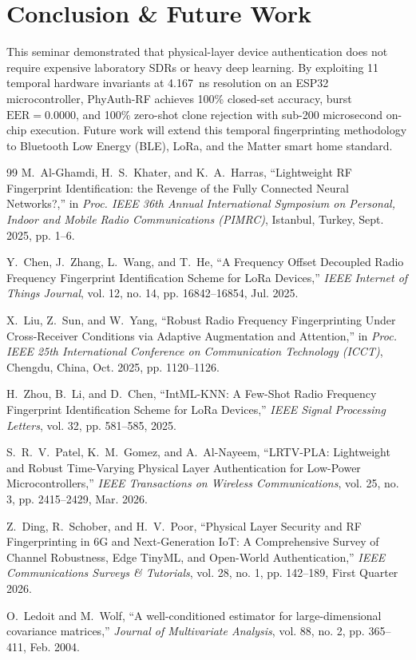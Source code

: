 \documentclass[11pt,a4paper]{article}
\begin{document}
\section{Conclusion \& Future Work}
This seminar demonstrated that physical-layer device authentication does not require expensive laboratory SDRs or heavy deep learning. By exploiting 11 temporal hardware invariants at 4.167~ns resolution on an ESP32 microcontroller, PhyAuth-RF achieves 100\% closed-set accuracy, burst $\text{EER} = 0.0000$, and 100\% zero-shot clone rejection with sub-200 microsecond on-chip execution. Future work will extend this temporal fingerprinting methodology to Bluetooth Low Energy (BLE), LoRa, and the Matter smart home standard.

\begin{thebibliography}{99}
\small
{}
M.~Al-Ghamdi, H.~S.~Khater, and K.~A.~Harras, ``Lightweight RF Fingerprint Identification: the Revenge of the Fully Connected Neural Networks?,'' in \textit{Proc. IEEE 36th Annual International Symposium on Personal, Indoor and Mobile Radio Communications (PIMRC)}, Istanbul, Turkey, Sept. 2025, pp. 1--6.

Y.~Chen, J.~Zhang, L.~Wang, and T.~He, ``A Frequency Offset Decoupled Radio Frequency Fingerprint Identification Scheme for LoRa Devices,'' \textit{IEEE Internet of Things Journal}, vol. 12, no. 14, pp. 16842--16854, Jul. 2025.

X.~Liu, Z.~Sun, and W.~Yang, ``Robust Radio Frequency Fingerprinting Under Cross-Receiver Conditions via Adaptive Augmentation and Attention,'' in \textit{Proc. IEEE 25th International Conference on Communication Technology (ICCT)}, Chengdu, China, Oct. 2025, pp. 1120--1126.

H.~Zhou, B.~Li, and D.~Chen, ``IntML-KNN: A Few-Shot Radio Frequency Fingerprint Identification Scheme for LoRa Devices,'' \textit{IEEE Signal Processing Letters}, vol. 32, pp. 581--585, 2025.

S.~R.~V.~Patel, K.~M.~Gomez, and A.~Al-Nayeem, ``LRTV-PLA: Lightweight and Robust Time-Varying Physical Layer Authentication for Low-Power Microcontrollers,'' \textit{IEEE Transactions on Wireless Communications}, vol. 25, no. 3, pp. 2415--2429, Mar. 2026.

Z.~Ding, R.~Schober, and H.~V.~Poor, ``Physical Layer Security and RF Fingerprinting in 6G and Next-Generation IoT: A Comprehensive Survey of Channel Robustness, Edge TinyML, and Open-World Authentication,'' \textit{IEEE Communications Surveys \& Tutorials}, vol. 28, no. 1, pp. 142--189, First Quarter 2026.

O.~Ledoit and M.~Wolf, ``A well-conditioned estimator for large-dimensional covariance matrices,'' \textit{Journal of Multivariate Analysis}, vol. 88, no. 2, pp. 365--411, Feb. 2004.
\end{thebibliography}
\end{document}
